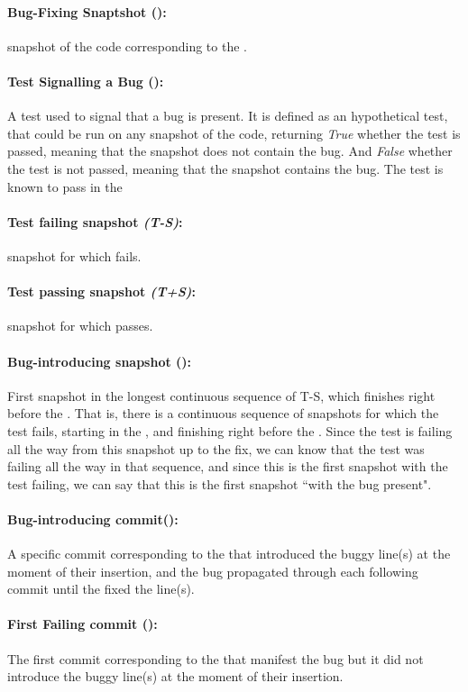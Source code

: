 \documentclass[a4paper, 12pt]{book}
\begin{document}
\paragraph{\textbf{Bug-Fixing Snaptshot (\BFS):}} snapshot of the code corresponding to the \BFC.
\paragraph{\textbf{Test Signalling a Bug (\TSB):}} A test used to signal that a bug is present. It is defined as an hypothetical test, that could be run on any snapshot of the code, returning \emph{True} whether the test is passed, meaning that the snapshot does not contain the bug. And \emph{False} whether the test is not passed, meaning that the snapshot contains the bug. The test is known to pass in the 
\paragraph{\textbf{Test failing snapshot \emph{(T-S)}:}}  snapshot for which \TSB fails.
\paragraph{\textbf{Test passing snapshot \emph{(T+S)}:}}  snapshot for which \TSB passes.
\paragraph{\textbf{Bug-introducing snapshot (\BIS):}}  First snapshot in the longest continuous sequence of T-S, which finishes right before the \BFS. That is, there is a continuous sequence of snapshots for which the test fails, starting in the \BIS, and finishing right before the \BFS. Since the test is failing all the way from this snapshot up to the fix, we can know that the test was failing all the way in that sequence, and since this is the first snapshot with the test failing, we can say that this is the first snapshot ``with the bug present".
\paragraph{\textbf{Bug-introducing commit(\BIC):}} A specific commit corresponding to the \BIS that introduced the buggy line(s) at the moment of their insertion, and the bug propagated through each following commit until the \BFC fixed the line(s).
\paragraph{\textbf{First Failing commit (\FFC):}} The first commit corresponding to the \BIS that manifest the bug but it did not introduce the buggy line(s) at the moment of their insertion.
\end{document}
